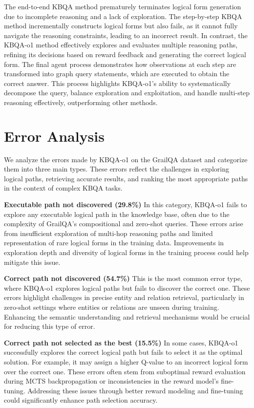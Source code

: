 \documentclass{article}
\theoremstyle{plain}
\theoremstyle{definition}
\theoremstyle{remark}
\begin{document}
The end-to-end KBQA method prematurely terminates logical form generation due to incomplete reasoning and a lack of exploration. The step-by-step KBQA method incrementally constructs logical forms but also fails, as it cannot fully navigate the reasoning constraints, leading to an incorrect result. In contrast, the KBQA-o1 method effectively explores and evaluates multiple reasoning paths, refining its decisions based on reward feedback and generating the correct logical form. The final agent process demonstrates how observations at each step are transformed into graph query statements, which are executed to obtain the correct answer. This process highlights KBQA-o1’s ability to systematically decompose the query, balance exploration and exploitation, and handle multi-step reasoning effectively, outperforming other methods.


\section{Error Analysis}
We analyze the errors made by KBQA-o1 on the GrailQA dataset and categorize them into three main types. These errors reflect the challenges in exploring logical paths, retrieving accurate results, and ranking the most appropriate paths in the context of complex KBQA tasks.

\textbf{Executable path not discovered (29.8\%)} In this category, KBQA-o1 fails to explore any executable logical path in the knowledge base, often due to the complexity of GrailQA’s compositional and zero-shot queries. These errors arise from insufficient exploration of multi-hop reasoning paths and limited representation of rare logical forms in the training data. Improvements in exploration depth and diversity of logical forms in the training process could help mitigate this issue.

\textbf{Correct path not discovered (54.7\%)} This is the most common error type, where KBQA-o1 explores logical paths but fails to discover the correct one. These errors highlight challenges in precise entity and relation retrieval, particularly in zero-shot settings where entities or relations are unseen during training. Enhancing the semantic understanding and retrieval mechanisms would be crucial for reducing this type of error.

\textbf{Correct path not selected as the best (15.5\%)} In some cases, KBQA-o1 successfully explores the correct logical path but fails to select it as the optimal solution. For example, it may assign a higher Q-value to an incorrect logical form over the correct one. These errors often stem from suboptimal reward evaluation during MCTS backpropagation or inconsistencies in the reward model’s fine-tuning. Addressing these issues through better reward modeling and fine-tuning could significantly enhance path selection accuracy.
\end{document}
